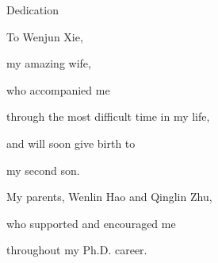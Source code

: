 
\begin{dedication} %

{\Huge Dedication }\\
\vspace{10mm}

{\LARGE
To Wenjun Xie,

my amazing wife, 

who accompanied me 

through the most difficult time in my life,

and will soon give birth to 

my second son.

My parents, Wenlin Hao and Qinglin Zhu,

who supported and encouraged me 

throughout my Ph.D. career.

}

\end{dedication}

